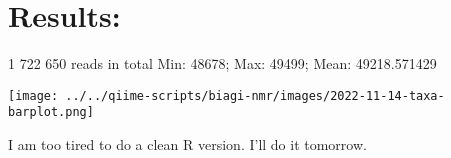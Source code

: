 \documentclass[
]{article}
\begin{document}
\hypertarget{results}{%
\section{Results:}\label{results}}

1 722 650 reads in total Min: 48678; Max: 49499; Mean: 49218.571429

\texttt{[image: ../../qiime-scripts/biagi-nmr/images/2022-11-14-taxa-barplot.png]}

I am too tired to do a clean R version. I'll do it tomorrow.
\end{document}
